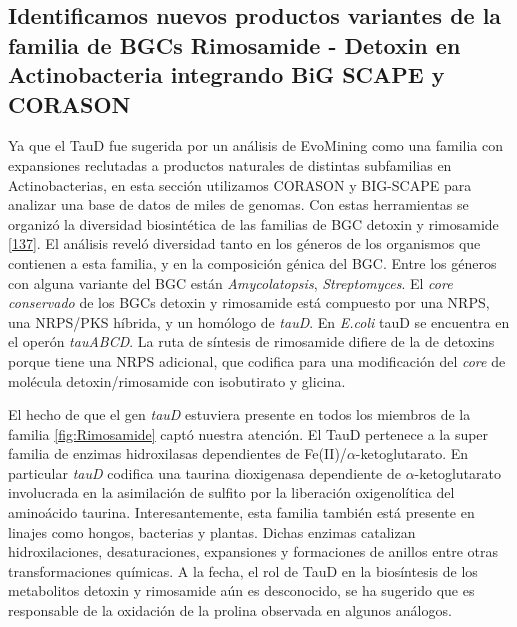\documentclass[12pt,twoside]{reedthesis}
\begin{document}
  \subsection{Identificamos nuevos productos variantes de la familia de
  BGCs Rimosamide - Detoxin en Actinobacteria integrando BiG SCAPE y
  CORASON}\label{identificamos-nuevos-productos-variantes-de-la-familia-de-bgcs-rimosamide---detoxin-en-actinobacteria-integrando-big-scape-y-corason}
  
  Ya que el TauD fue sugerida por un análisis de EvoMining como una
  familia con expansiones reclutadas a productos naturales de distintas
  subfamilias en Actinobacterias, en esta sección utilizamos CORASON y
  BIG-SCAPE para analizar una base de datos de miles de genomas. Con estas
  herramientas se organizó la diversidad biosintética de las familias de
  BGC detoxin y rimosamide
  {[}\protect\hyperlink{ref-mcclure_elucidating_2016}{137}{]}. El análisis
  reveló diversidad tanto en los géneros de los organismos que contienen a
  esta familia, y en la composición génica del BGC. Entre los géneros con
  alguna variante del BGC están \emph{Amycolatopsis}, \emph{Streptomyces}.
  El \emph{core conservado} de los BGCs detoxin y rimosamide está
  compuesto por una NRPS, una NRPS/PKS híbrida, y un homólogo de
  \emph{tauD}. En \emph{E.coli} tauD se encuentra en el operón
  \emph{tauABCD}. La ruta de síntesis de rimosamide difiere de la de
  detoxins porque tiene una NRPS adicional, que codifica para una
  modificación del \emph{core} de molécula detoxin/rimosamide con
  isobutirato y glicina.
  
  El hecho de que el gen \emph{tauD} estuviera presente en todos los
  miembros de la familia \autoref{fig:Rimosamide} captó nuestra atención.
  El TauD pertenece a la super familia de enzimas hidroxilasas
  dependientes de Fe(II)/\(\alpha\)-ketoglutarato. En particular
  \emph{tauD} codifica una taurina dioxigenasa dependiente de
  \(\alpha\)-ketoglutarato involucrada en la asimilación de sulfito por la
  liberación oxigenolítica del aminoácido taurina. Interesantemente, esta
  familia también está presente en linajes como hongos, bacterias y
  plantas. Dichas enzimas catalizan hidroxilaciones, desaturaciones,
  expansiones y formaciones de anillos entre otras transformaciones
  químicas. A la fecha, el rol de TauD en la biosíntesis de los
  metabolitos detoxin y rimosamide aún es desconocido, se ha sugerido que
  es responsable de la oxidación de la prolina observada en algunos
  análogos.
  
\end{document}
